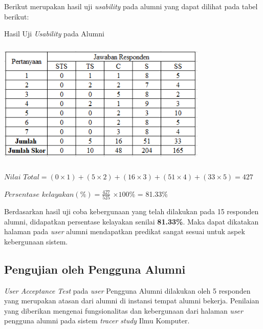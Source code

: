 \begin{enumerate}
	Berikut merupakan hasil uji \textit{usability} pada alumni yang dapat dilihat pada tabel berikut:
	
	\begin{table}[H]
		\centering
		\caption{Hasil Uji \textit{Usability} pada Alumni}
		\includegraphics[width=10cm,height=6cm]{gambar/UAT/hasil_u_alumni}
		\label{h_u_alumni}
	\end{table}
	
	$Nilai$ $Total = (0 \times 1) + (5 \times 2) + (16 \times 3) + (51 \times 4) + (33 \times 5) = 427$
		
	$Persentase$ $kelayakan (\%) = \frac{427}{525} $ $\times 100\%$ = 81.33\%
	
	Berdasarkan hasil uji coba kebergunaan yang telah dilakukan pada 15 responden alumni, didapatkan persentase kelayakan senilai \textbf{81.33\%}. Maka dapat dikatakan halaman pada \textit{user} alumni mendapatkan predikat sangat sesuai untuk aspek kebergunaan sistem.
	
\end{enumerate}

\subsection{Pengujian oleh Pengguna Alumni}
\textit{User Acceptance Test} pada \textit{user} Pengguna Alumni dilakukan oleh 5 responden yang merupakan atasan dari alumni di instansi tempat alumni bekerja. Penilaian yang diberikan mengenai fungsionalitas dan kebergunaan dari halaman \textit{user} pengguna alumni pada sistem \textit{tracer study} Ilmu Komputer.

